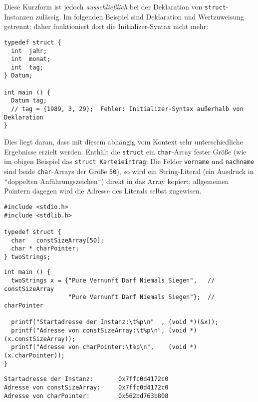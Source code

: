 Diese Kurzform ist jedoch \emph{ausschließlich} bei der Deklaration von \texttt{struct}-Instanzen zulässig. Im folgenden Beispiel sind Deklaration und Wertzuweisung getrennt; daher funktioniert dort die Initializer-Syntax nicht mehr:

\begin{codebox}
\begin{verbatim}
typedef struct {
  int  jahr;
  int  monat;
  int  tag;
} Datum;

int main () {
  Datum tag;
  // tag = {1989, 3, 29};  Fehler: Initializer-Syntax außerhalb von Deklaration
}
\end{verbatim}
\end{codebox}

Dies liegt daran, dass mit diesem abhängig vom Kontext sehr unterschiedliche Ergebnisse erzielt werden. Enthält die \texttt{struct} ein \texttt{char}-Array fester Größe (wie im obigen Beispiel das \texttt{struct Karteieintrag}: Die Felder \texttt{vorname} und \texttt{nachname} sind beide \texttt{char}-Arrays der Größe \texttt{50}), so wird ein String-Literal (ein Ausdruck in \texttt{"}doppelten Anführungszeichen\texttt{"}) direkt in das Array kopiert; allgemeinen Pointern dagegen wird die Adresse des Literals selbst zugewisen.

\begin{codebox}
\begin{verbatim}
#include <stdio.h>
#include <stdlib.h>

typedef struct {
  char   constSizeArray[50];
  char * charPointer;
} twoStrings;
\end{verbatim}
\end{codebox}
%
\begin{codebox}[]
\begin{verbatim}
int main () {
  twoStrings x = {"Pure Vernunft Darf Niemals Siegen",   // constSizeArray
                  "Pure Vernunft Darf Niemals Siegen"};  // charPointer

  printf("Startadresse der Instanz:\t%p\n"  , (void *)(&x));
  printf("Adresse von constSizeArray:\t%p\n", (void *)(x.constSizeArray));
  printf("Adresse von charPointer:\t%p\n",    (void *)(x.charPointer));
}
\end{verbatim}
\end{codebox}

\begin{cmdbox}
\begin{verbatim}
Startadresse der Instanz:       0x7ffc0d4172c0
Adresse von constSizeArray:     0x7ffc0d4172c0
Adresse von charPointer:        0x562bd763b808
\end{verbatim}
\end{cmdbox}

